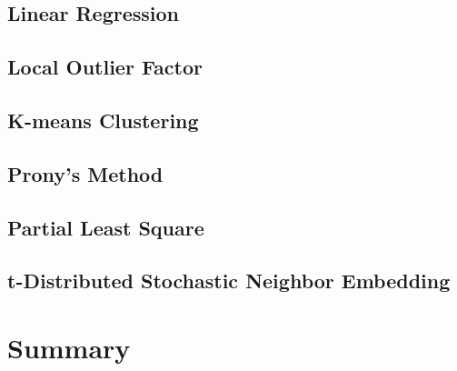 \subsection{Linear Regression}

\subsection{Local Outlier Factor}

\subsection{K-means Clustering}

\subsection{Prony's Method}

\subsection{Partial Least Square}

\subsection{t-Distributed Stochastic Neighbor Embedding}

\section{Summary}